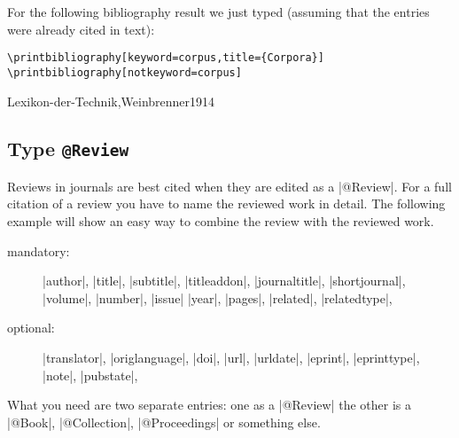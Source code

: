\documentclass[a4paper,
10pt,
greek,
french,
spanish,
italian,
ngerman,
english
]{ltxdoc}
\begin{document}
For the following bibliography result we just typed (assuming that the entries were already cited in text):
\begin{lstlisting}
\printbibliography[keyword=corpus,title={Corpora}]
\printbibliography[notkeyword=corpus]
\end{lstlisting}

\begin{refsection}\setlength{\labwidthsameline}{7em} 

\begin{bibbsp}{Lexikon-der-Technik,Weinbrenner1914}
\nocite{Lexikon-der-Technik,Weinbrenner1914}
\printbibliography[keyword=corpus,title={Corpora}]
\printbibliography[notkeyword=corpus]
\end{bibbsp}
\end{refsection}


 
\subsection{Type \texttt{@Review}}\label{review}
Reviews in journals are best cited when they are edited as a |@Review|.
For a full citation of a review you have to name the reviewed work in detail.
The following example will show an easy way to combine the review with the reviewed work.

\begin{description}
\item[mandatory:] 
|author|, |title|, |subtitle|, |titleaddon|,
|journaltitle|, |shortjournal|, |volume|, |number|, |issue|
|year|, |pages|, 
|related|, |relatedtype|,
\item[optional:]
|translator|, |origlanguage|,
|doi|, |url|, |urldate|, |eprint|, |eprinttype|, |note|, |pubstate|, 
 \end{description}

What you need are two separate entries: one as a |@Review| the other is a |@Book|, |@Collection|, |@Proceedings| or something else.
\end{document}
